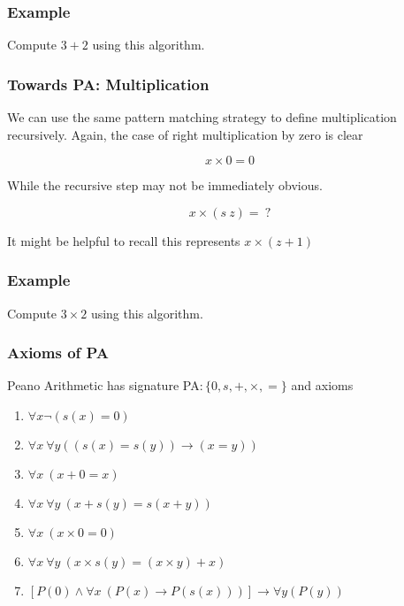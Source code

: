 \documentclass{beamer}
\theoremstyle{indentDefn} \newtheorem{defn}[]{Definition}
\begin{document}
\begin{frame}
	\frametitle{Example}

	Compute $3 + 2$ using this algorithm. 

	\vspace{60mm}

\end{frame}

\begin{frame}
	\frametitle{Towards PA: Multiplication}

	We can use the same pattern matching strategy to define multiplication recursively. Again, the case of right multiplication by zero is clear

	$$x \times 0 = 0$$

	While the recursive step may not be immediately obvious.

	$$x \times (s \ z) = \ ?$$

	It might be helpful to recall this represents $x \times (z + 1)$

	\vspace{2cm}

\end{frame}

\begin{frame}
	\frametitle{Example}

	Compute $3 \times 2$ using this algorithm. 

	\vspace{6cm}

\end{frame} 

\begin{frame}
	\frametitle{Axioms of PA}
	
	Peano Arithmetic has signature PA$: \{0, s, +, \times, =\}$ and axioms
	
	\begin{enumerate}
		\item $\forall x \lnot(s(x) = 0)$
		\item $\forall x \ \forall y ((s(x) = s(y)) \to (x = y))$		\item $\forall x \ (x + 0 = x)$
		\item $\forall x \ \forall y \ (x + s(y) = s(x + y))$
		\item $\forall x \ (x \times 0 = 0)$
		\item $\forall x \ \forall y \ (x \times s(y) = (x \times y) + x)$
		\item $[P(0) \land \forall x \ (P(x) \to P(s(x)))] \rightarrow \forall y (P(y))$
	\end{enumerate}

\end{frame}
\end{document}
